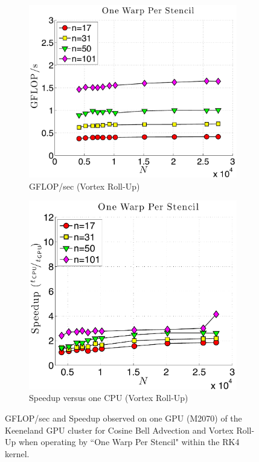 \begin{figure}
\begin{subfigure}[t]{0.46\textwidth}
\includegraphics[width=\textwidth]{../figures/keeneland_results/alltoallv_vortex/gflops_gpu_1proc_oneWarpPerStencil.pdf}
\caption{GFLOP/sec (Vortex Roll-Up)}
\label{fig:gflops_gpu_1proc_oneWarp_keeneland_vortex}
\end{subfigure} 
\quad
\begin{subfigure}[t]{0.425\textwidth}
\includegraphics[width=\textwidth]{../figures/keeneland_results/alltoallv_vortex/speedup_1proc_oneWarpPerStencil.pdf}
\caption{Speedup versus one CPU (Vortex Roll-Up)}
\label{fig:speedup_1proc_oneWarp_keeneland_vortex}
\end{subfigure} 
\caption{GFLOP/sec and Speedup observed on one GPU (M2070) of the Keeneland GPU cluster for Cosine Bell Advection and Vortex Roll-Up when operating by ``One Warp Per Stencil" within the RK4 kernel.}
\label{fig:1proc_oneWarp_keeneland}
\end{figure} 


